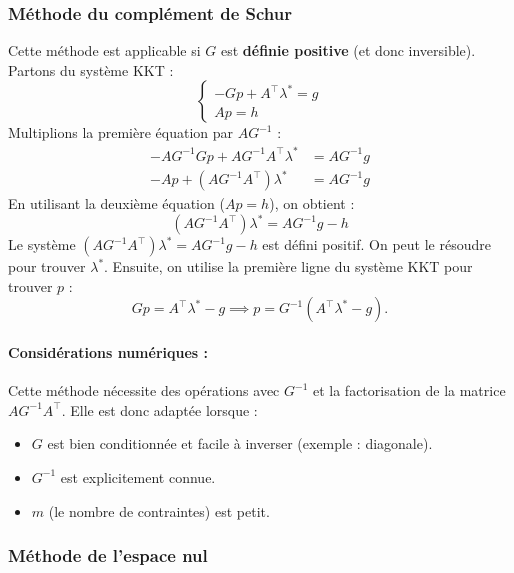 \subsubsection{Méthode du complément de Schur}

Cette méthode est applicable si $G$ est \textbf{définie positive} (et donc inversible).
Partons du système KKT :
\begin{equation}
    \begin{cases}
        -Gp + A^\top \lambda^* = g \\
        Ap = h
    \end{cases}
\end{equation}
Multiplions la première équation par $AG^{-1}$ :
\begin{align*}
    -AG^{-1}Gp + AG^{-1}A^\top \lambda^* &= AG^{-1}g \\
    -Ap + (AG^{-1}A^\top) \lambda^* &= AG^{-1}g
\end{align*}
En utilisant la deuxième équation ($Ap=h$), on obtient :
\begin{equation}
    (AG^{-1}A^\top) \lambda^* = AG^{-1}g - h
\end{equation}
Le système $(AG^{-1}A^\top) \lambda^* = AG^{-1}g - h$ est défini positif. On peut le résoudre pour trouver $\lambda^*$.
Ensuite, on utilise la première ligne du système KKT pour trouver $p$ :
\begin{equation}
    Gp = A^\top \lambda^* - g \implies p = G^{-1}(A^\top \lambda^* - g).
\end{equation}

\paragraph{Considérations numériques :}
Cette méthode nécessite des opérations avec $G^{-1}$ et la factorisation de la matrice $AG^{-1}A^\top$. Elle est donc adaptée lorsque :
\begin{itemize}
    \item $G$ est bien conditionnée et facile à inverser (exemple : diagonale).
    \item $G^{-1}$ est explicitement connue.
    \item $m$ (le nombre de contraintes) est petit.
\end{itemize}

\subsubsection{Méthode de l'espace nul}

